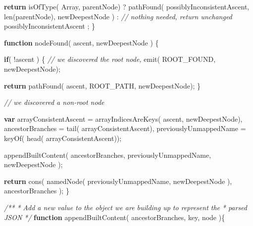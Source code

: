 \documentclass[12pt, ]{article}
\newenvironment{Shaded}{}{}
\newcommand{\KeywordTok}[1]{\textcolor[rgb]{0.00,0.44,0.13}{\textbf{{#1}}}}
\newcommand{\CommentTok}[1]{\textcolor[rgb]{0.38,0.63,0.69}{\textit{{#1}}}}
\newcommand{\FunctionTok}[1]{\textcolor[rgb]{0.02,0.16,0.49}{{#1}}}
\newcommand{\NormalTok}[1]{{#1}}
\begin{document}
\begin{Shaded}
\begin{Highlighting}[]
      \KeywordTok{return}      \FunctionTok{isOfType}\NormalTok{( Array, parentNode)}
               \NormalTok{?}
                  \FunctionTok{pathFound}\NormalTok{(  possiblyInconsistentAscent, }
                              \FunctionTok{len}\NormalTok{(parentNode), }
                              \NormalTok{newDeepestNode}
                  \NormalTok{)}
               \NormalTok{:  }
                  \CommentTok{// nothing needed, return unchanged}
                  \NormalTok{possiblyInconsistentAscent }
               \NormalTok{;}
   \NormalTok{\}}
                 
   \KeywordTok{function} \FunctionTok{nodeFound}\NormalTok{( ascent, newDeepestNode ) \{}
      
      \KeywordTok{if}\NormalTok{( !ascent ) \{}
         \CommentTok{// we discovered the root node,}
         \FunctionTok{emit}\NormalTok{( ROOT_FOUND, newDeepestNode);}
                    
         \KeywordTok{return} \FunctionTok{pathFound}\NormalTok{( ascent, ROOT_PATH, newDeepestNode);         }
      \NormalTok{\}}

      \CommentTok{// we discovered a non-root node}
                 
      \KeywordTok{var} \NormalTok{arrayConsistentAscent  = }\FunctionTok{arrayIndicesAreKeys}\NormalTok{( ascent, newDeepestNode),      }
          \NormalTok{ancestorBranches       = }\FunctionTok{tail}\NormalTok{( arrayConsistentAscent),}
          \NormalTok{previouslyUnmappedName = }\FunctionTok{keyOf}\NormalTok{( }\FunctionTok{head}\NormalTok{( arrayConsistentAscent));}
          
      \FunctionTok{appendBuiltContent}\NormalTok{( }
         \NormalTok{ancestorBranches, }
         \NormalTok{previouslyUnmappedName, }
         \NormalTok{newDeepestNode }
      \NormalTok{);}
                                                                                                         
      \KeywordTok{return} \FunctionTok{cons}\NormalTok{( }
               \FunctionTok{namedNode}\NormalTok{( previouslyUnmappedName, newDeepestNode ), }
               \NormalTok{ancestorBranches}
      \NormalTok{);                                                                          }
   \NormalTok{\}}


   \CommentTok{/**}
\CommentTok{    * Add a new value to the object we are building up to represent the}
\CommentTok{    * parsed JSON}
\CommentTok{    */}
   \KeywordTok{function} \FunctionTok{appendBuiltContent}\NormalTok{( ancestorBranches, key, node )\{}
     

\end{Highlighting}
\end{Shaded}
\end{document}
